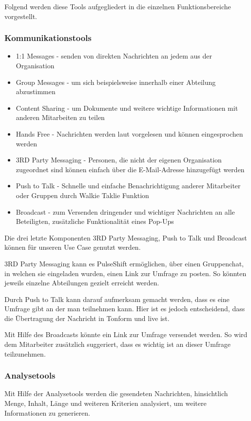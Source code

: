Folgend werden diese Tools aufgegliedert in die einzelnen Funktionsbereiche vorgestellt.

\subsubsection{Kommunikationstools}

\begin{itemize}
\item 1:1 Messages - senden von direkten Nachrichten an jedem aus der Organisation
\item Group Messages - um sich beispielsweise innerhalb einer Abteilung abzustimmen
\item Content Sharing - um Dokumente und weitere wichtige Informationen mit anderen Mitarbeiten zu teilen
\item Hands Free - Nachrichten werden laut vorgelesen und können eingesprochen werden
\item 3RD Party Messaging - Personen, die nicht der eigenen Organisation zugeordnet sind können einfach über die E-Mail-Adresse hinzugefügt werden
\item Push to Talk - Schnelle und einfache Benachrichtigung anderer Mitarbeiter oder Gruppen durch Walkie Taklie Funktion
\item Broadcast - zum Versenden dringender und wichtiger Nachrichten an alle Beteiligten, zusätzliche Funktionalität eines Pop-Ups
\end{itemize}

Die drei letzte Komponenten 3RD Party Messaging, Push to Talk und Broadcast können für unseren Use Case genutzt werden.

3RD Party Messaging kann es PulseShift ermöglichen, über einen Gruppenchat, in welchen sie eingeladen wurden, einen Link zur Umfrage zu posten. So könnten jeweils einzelne Abteilungen gezielt erreicht werden.

Durch Push to Talk kann darauf aufmerksam gemacht werden, dass es eine Umfrage gibt an der man teilnehmen kann. Hier ist es jedoch entscheidend, dass die Übertragung der Nachricht in Tonform und live ist. 

Mit Hilfe des Broadcasts könnte ein Link zur Umfrage versendet werden. So wird dem Mitarbeiter zusätzlich suggeriert, dass es wichtig ist an dieser Umfrage teilzunehmen. 

\subsubsection{Analysetools}
Mit Hilfe der Analysetools werden die gesendeten Nachrichten, hinsichtlich Menge, Inhalt, Länge und weiteren Kriterien analysiert, um weitere Informationen zu generieren. 


